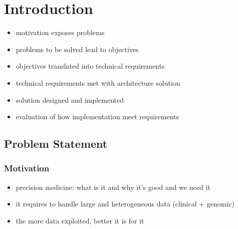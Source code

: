 




\chapter{Introduction}

\begin{itemize}
    \item motivation exposes problems
    \item problems to be solved lead to objectives
    \item objectives translated into technical requirements
    \item technical requirements met with architecture solution
    \item solution designed and implemented
    \item evaluation of how implementation meet requirements
\end{itemize}

\section{Problem Statement}
\label{sec:problem}

\subsection*{Motivation}

\begin{itemize}
    \item precision medicine: what is it and why it's good and we need it
    \item it requires to handle large and heterogeneous data (clinical + genomic)
    \item the more data exploited, better it is for it
\end{itemize}


